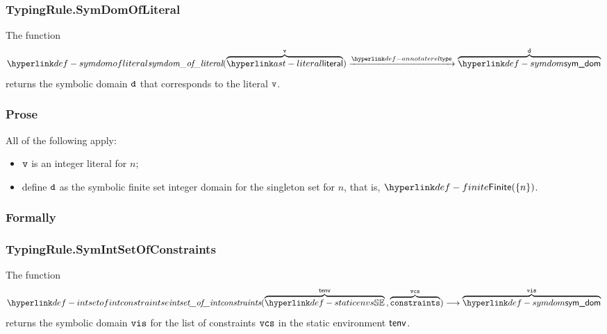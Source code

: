 \begin{mathpar}
\end{mathpar}

\subsubsection{TypingRule.SymDomOfLiteral \label{sec:TypingRule.SymDomOfLiteral}}
\hypertarget{def-symdomofliteral}{}
The function
\[
\symdomofliteral(\overname{\literal}{\vv}) \typearrow \overname{\symdom}{\vd}
\]
returns the symbolic domain $\vd$ that corresponds to the literal $\vv$.

\subsubsection{Prose}
All of the following apply:
\begin{itemize}
  \item $\vv$ is an integer literal for $n$;
  \item define $\vd$ as the symbolic finite set integer domain for the singleton set for $n$, that is, $\Finite(\{n\})$.
\end{itemize}

\subsubsection{Formally}
\begin{mathpar}
\end{mathpar}

\subsubsection{TypingRule.SymIntSetOfConstraints \label{sec:TypingRule.SymIntSetOfConstraints}}
\hypertarget{def-intsetofintconstraintse}{}
The function
\[
  \intsetofintconstraints(
    \overname{\staticenvs}{\tenv} \aslsep
    \overname{\constraints}{\vcs}
  ) \aslto
  \overname{\symdom}{\vis}
\]
returns the symbolic domain $\vis$ for the list of constraints $\vcs$
in the static environment $\tenv$.

